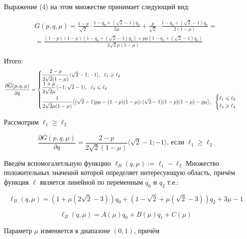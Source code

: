 \begin{flushleft}
	Выражение (4) на этом множестве принимает следующий вид:	
	
	\begin{gather*}	
		\overline G(p,q,\mu)=
		\frac{1-p}{\sqrt{2}} \cdot \frac{1-q_0+(\sqrt{2}-1)q_2}{2\mu} +
		\frac{p}{\sqrt{2}} \cdot \frac{1-q_2+(\sqrt{2}-1)q_0}{2(1-\mu)}=\\	
		=\frac{(1-p)(1-\mu)(1-q_0+(\sqrt{2}-1)q_2)+p\mu(1-q_2+(\sqrt{2}-1)q_0)}
		{2\sqrt{2}\mu(1-\mu)}
	\end{gather*}
	
	Итого: 
	$$
	\frac{\partial \overline{G}(p,q,\mu)}{\partial q}=
	\begin{cases}
		\dfrac{2-p}{2\sqrt{2}(1-\mu)} \langle \sqrt{2}-1; -1 \rangle 
 		,\hspace{2mm}
 		\ell_1 \geqslant \ell_2\\
		
		\dfrac{1+p}{2\sqrt{2}\mu} \langle -1; \sqrt{2}-1 \rangle
		,\hspace{2mm}
		\ell_3 \leqslant \ell_4\\
		
		\dfrac{1}{2\sqrt{2}\mu(1-\mu)}
		\big \langle 
			(\sqrt{2} - 1)p\mu -(1-p)(1-\mu);
			(\sqrt{2} - 1)(1-p)(1-\mu) - p\mu			
		\big \rangle
		,\hspace{2mm}
		\begin{cases}
			\ell_1 \leqslant \ell_2\\
			\ell_3 \geqslant \ell_4\\
		\end{cases}
	\end{cases}
	$$
	

	 Рассмотрим $\ell_1 \geqslant \ell_2$
	
	$$\frac{\partial \overline{G}(p,q,\mu)}{\partial q}=
	\frac{2-p}{2\sqrt{2}(1-\mu)} \langle \sqrt{2}-1; -1 \rangle 
 	\textrm{, если }\ell_1 \geqslant \ell_2$$
 	
	Введём вспомогалетльную функцию	
 	$\ell_B(q, \mu):=\ell_1-\ell_2$
 	Множество положительных значений которой определяет интересующую область,
 	причём функция $\ell$ является линейной по переменным $q_0$ и $q_2$ т.е.:
 	
	$$\ell_B(q, \mu) = 
	(1+\mu(2\sqrt{2}-3))q_0+
	(1-\sqrt{2}+\mu(\sqrt{2}-3))q_2
	+3\mu-1$$ 	
 	
	$$\ell_B(q, \mu)=A(\mu)q_0+B(\mu)q_1+C(\mu)$$
	
	Параметр $\mu$ изменяется в диапазоне $(0,1)$, причём	
	

\end{flushleft}
